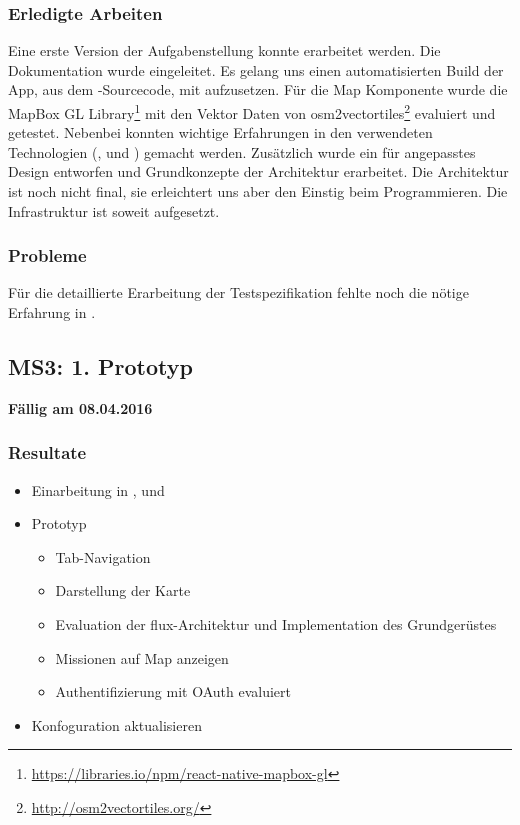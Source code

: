 \subsubsection{Erledigte Arbeiten}
Eine erste Version der Aufgabenstellung konnte erarbeitet werden. 
Die Dokumentation wurde eingeleitet.
Es gelang uns einen automatisierten Build der App, aus dem -Sourcecode, mit  aufzusetzen.
Für die Map Komponente wurde die MapBox GL Library\footnote{\url{https://libraries.io/npm/react-native-mapbox-gl}} mit den Vektor Daten von osm2vectortiles\footnote{\url{http://osm2vectortiles.org/}} evaluiert und getestet.
Nebenbei konnten wichtige Erfahrungen in den verwendeten Technologien (,  und ) gemacht werden.
Zusätzlich wurde ein für  angepasstes Design entworfen und Grundkonzepte der Architektur erarbeitet.
Die Architektur ist noch nicht final, sie erleichtert uns aber den Einstig beim Programmieren.
Die Infrastruktur ist soweit aufgesetzt.

\subsubsection{Probleme}
Für die detaillierte Erarbeitung der Testspezifikation fehlte noch die nötige Erfahrung in .


\subsection{MS3: 1. Prototyp}
\label{pm-ms3}
\textbf{Fällig am 08.04.2016}
\subsubsection{Resultate}
\begin{itemize}
	\item Einarbeitung in ,  und 
	\item {} Prototyp
	\begin{itemize}
		\item Tab-Navigation
		\item Darstellung der Karte
		\item Evaluation der flux-Architektur und Implementation des Grundgerüstes
		\item Missionen auf Map anzeigen
		\item Authentifizierung mit \gls{OAuth} evaluiert
	\end{itemize}
	\item {} Konfoguration aktualisieren
\end{itemize}

